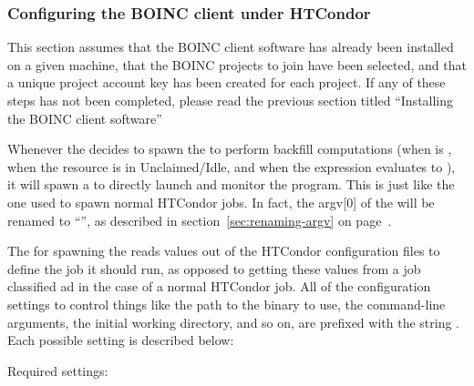 \subsubsection{\label{sec:Backfill-BOINC-HTCondor}Configuring the BOINC client
under HTCondor}


This section assumes that the BOINC client software has already been
installed on a given machine, that the BOINC projects to join have
been selected, and that a unique project account key has been created
for each project.
If any of these steps has not been completed, please read the previous
section titled ``Installing the BOINC client software''

Whenever the  decides to spawn the 
to perform backfill computations (when  is
, when the resource is in Unclaimed/Idle, and when the
 expression evaluates to ), it will
spawn a  to directly launch and monitor the
 program.
This  is just like the one used to spawn normal HTCondor
jobs.
In fact, the argv[0] of the  will be renamed to
``'', as described in section~\ref{sec:renaming-argv} on 
page~\pageref{sec:renaming-argv}.

The  for spawning the  reads
values out of the HTCondor configuration files to define the job it
should run, as opposed to getting these values from a job classified
ad in the case of a normal HTCondor job.
All of the configuration settings to control things like the path to
the  binary to use, the command-line arguments,
the initial working directory, and so on, are prefixed with the string
.
Each possible setting is described below: 

Required settings:

